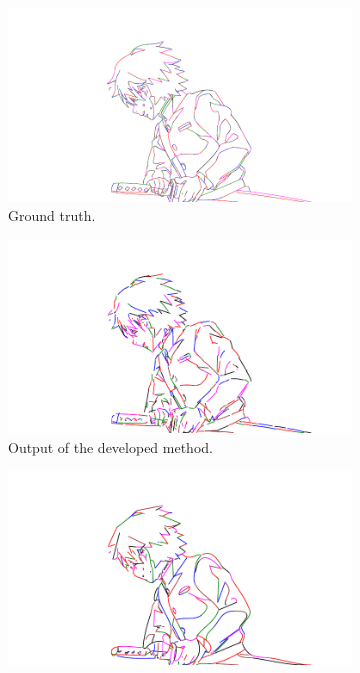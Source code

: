 \begin{figure}[h]
    \centering
    \begin{subfigure}{.49\textwidth}
    \includegraphics[width=\textwidth]{graphics/outputs/ground-truth/order/tonari-full_42.pdf}
    \caption{Ground truth.}
    \label{fig:tonari-full_42_full.order.gt}
    \end{subfigure}
    \begin{subfigure}{.49\textwidth}
    \includegraphics[width=\textwidth]{graphics/outputs/marked/order/tonari-full_42.pdf}
    \caption{Output of the developed method.}
    \end{subfigure}
    \begin{subfigure}{.49\textwidth}
    \includegraphics[width=\textwidth]{graphics/outputs/autotrace/order/tonari-full_42.pdf}

\end{subfigure}
\end{figure}
